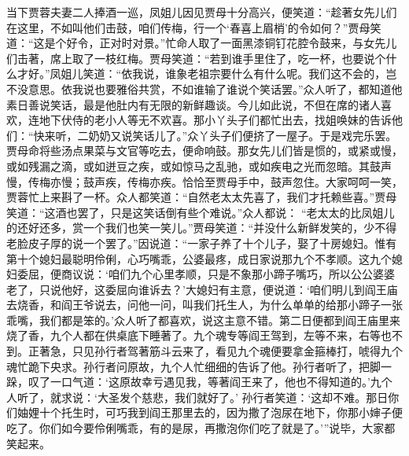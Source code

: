\begin{parag}


    当下贾蓉夫妻二人捧酒一巡，凤姐儿因见贾母十分高兴，便笑道：“趁著女先儿们在这里，不如叫他们击鼓，咱们传梅，行一个‘春喜上眉梢’的令如何？”贾母笑道：“这是个好令，正对时对景。”忙命人取了一面黑漆铜钉花腔令鼓来，与女先儿们击著，席上取了一枝红梅。贾母笑道：“若到谁手里住了，吃一杯，也要说个什么才好。”凤姐儿笑道：“依我说，谁象老祖宗要什么有什么呢。我们这不会的，岂不没意思。依我说也要雅俗共赏，不如谁输了谁说个笑话罢。”众人听了，都知道他素日善说笑话，最是他肚内有无限的新鲜趣谈。今儿如此说，不但在席的诸人喜欢，连地下伏侍的老小人等无不欢喜。那小丫头子们都忙出去，找姐唤妹的告诉他们：“快来听，二奶奶又说笑话儿了。”众丫头子们便挤了一屋子。于是戏完乐罢。贾母命将些汤点果菜与文官等吃去，便命响鼓。那女先儿们皆是惯的，或紧或慢，或如残漏之滴，或如迸豆之疾，或如惊马之乱驰，或如疾电之光而忽暗。其鼓声慢，传梅亦慢；鼓声疾，传梅亦疾。恰恰至贾母手中，鼓声忽住。大家呵呵一笑，贾蓉忙上来斟了一杯。众人都笑道：“自然老太太先喜了，我们才托赖些喜。”贾母笑道：“这酒也罢了，只是这笑话倒有些个难说。”众人都说： “老太太的比凤姐儿的还好还多，赏一个我们也笑一笑儿。”贾母笑道：“并没什么新鲜发笑的，少不得老脸皮子厚的说一个罢了。”因说道：“一家子养了十个儿子，娶了十房媳妇。惟有第十个媳妇最聪明伶俐，心巧嘴乖，公婆最疼，成日家说那九个不孝顺。这九个媳妇委屈，便商议说：‘咱们九个心里孝顺，只是不象那小蹄子嘴巧，所以公公婆婆老了，只说他好，这委屈向谁诉去？’大媳妇有主意，便说道：‘咱们明儿到阎王庙去烧香，和阎王爷说去，问他一问，叫我们托生人，为什么单单的给那小蹄子一张乖嘴，我们都是笨的。’众人听了都喜欢，说这主意不错。第二日便都到阎王庙里来烧了香，九个人都在供桌底下睡著了。九个魂专等阎王驾到，左等不来，右等也不到。正著急，只见孙行者驾著筋斗云来了，看见九个魂便要拿金箍棒打，唬得九个魂忙跪下央求。孙行者问原故，九个人忙细细的告诉了他。孙行者听了，把脚一跺，叹了一口气道：‘这原故幸亏遇见我，等著阎王来了，他也不得知道的。’九个人听了，就求说：‘大圣发个慈悲，我们就好了。’ 孙行者笑道：‘这却不难。那日你们妯娌十个托生时，可巧我到阎王那里去的，因为撒了泡尿在地下，你那小婶子便吃了。你们如今要伶俐嘴乖，有的是尿，再撒泡你们吃了就是了。’”说毕，大家都笑起来。
\end{parag}


